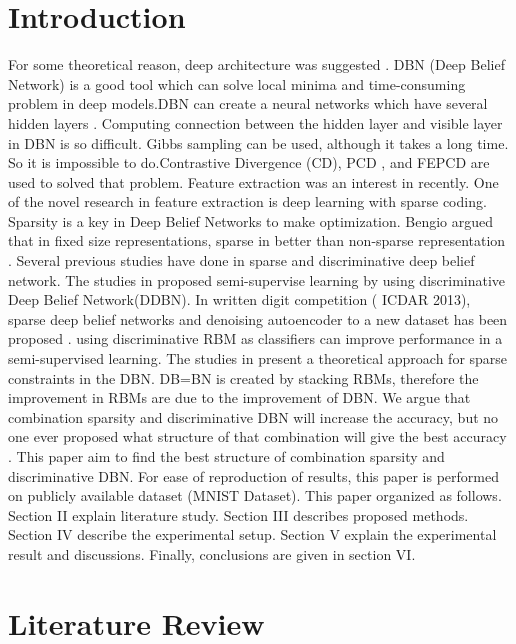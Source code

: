 \documentclass[conference]{IEEEtran}
\begin{document}
\section{Introduction}
For some theoretical reason, deep architecture was
suggested \cite{keyvanrad1}.
DBN (Deep Belief Network) is a good tool which can solve local minima and time-consuming problem in deep models.DBN can create a neural
networks which have several hidden layers \cite{liu1}.
Computing connection between the hidden layer and visible
layer in DBN is so difficult. Gibbs sampling can be used,
although it takes a long time. So it is impossible to
do.Contrastive Divergence (CD)\cite{carreiraperpinan1}, PCD \cite{tieleman1}, and FEPCD \cite{keyvanrad2}
are used to solved that problem.
Feature extraction was an interest in recently. One of the novel research in feature extraction is deep learning with sparse coding\cite{olshausen1}. Sparsity is a key in Deep Belief Networks to make optimization. Bengio argued that in fixed size representations, sparse in better than non-sparse representation \cite{bengio1}.
Several previous studies have done in sparse and
discriminative deep belief network. The studies in\cite{tieleman1}
proposed semi-supervise learning by using discriminative
Deep Belief Network(DDBN). In written digit competition ( ICDAR 2013), sparse deep
belief networks and denoising autoencoder to a new dataset has been proposed \cite{walid1}.\cite{larochelle1} using discriminative RBM as classifiers can
improve performance in a semi-supervised learning. The
studies in\cite{halkias1} present a theoretical approach for sparse
constraints in the DBN.
DB=BN is created by stacking RBMs, therefore the improvement in RBMs are due to the improvement of DBN. We argue that combination sparsity and discriminative
DBN will increase the accuracy, but no one ever proposed
what structure of that combination will give the best accuracy .
This paper aim to find the best structure of combination
sparsity and discriminative DBN. For ease of reproduction of
results, this paper is performed on publicly available dataset
(MNIST Dataset). This paper organized as follows. Section II
explain literature study. Section III describes proposed
methods. Section IV describe the experimental setup. Section
V explain the experimental result and discussions. Finally,
conclusions are given in section VI.

\section{Literature Review}
\end{document}
